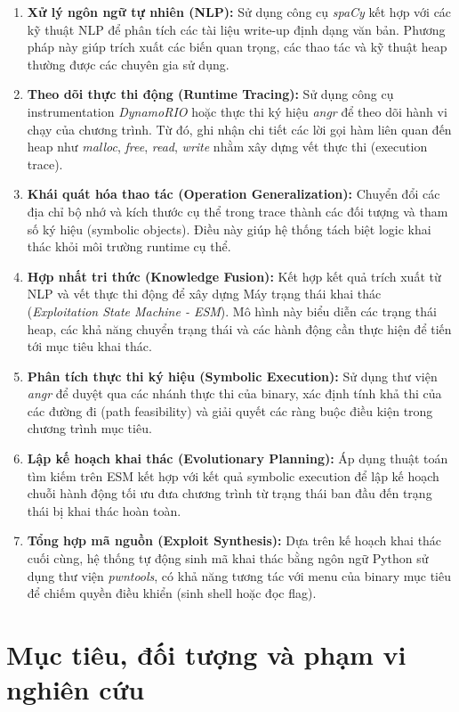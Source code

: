 \documentclass[final]{hcmuitthesis}
\begin{document}
\begin{enumerate}
    \item \textbf{Xử lý ngôn ngữ tự nhiên (NLP):} Sử dụng công cụ \textit{spaCy} kết hợp với các kỹ thuật NLP để phân tích các tài liệu write-up định dạng văn bản. Phương pháp này giúp trích xuất các biến quan trọng, các thao tác và kỹ thuật heap thường được các chuyên gia sử dụng.
    \item \textbf{Theo dõi thực thi động (Runtime Tracing):} Sử dụng công cụ instrumentation \textit{DynamoRIO} hoặc thực thi ký hiệu \textit{angr} để theo dõi hành vi chạy của chương trình. Từ đó, ghi nhận chi tiết các lời gọi hàm liên quan đến heap như \textit{malloc}, \textit{free}, \textit{read}, \textit{write} nhằm xây dựng vết thực thi (execution trace).
    \item \textbf{Khái quát hóa thao tác (Operation Generalization):} Chuyển đổi các địa chỉ bộ nhớ và kích thước cụ thể trong trace thành các đối tượng và tham số ký hiệu (symbolic objects). Điều này giúp hệ thống tách biệt logic khai thác khỏi môi trường runtime cụ thể.
    \item \textbf{Hợp nhất tri thức (Knowledge Fusion):} Kết hợp kết quả trích xuất từ NLP và vết thực thi động để xây dựng Máy trạng thái khai thác (\textit{Exploitation State Machine - ESM}). Mô hình này biểu diễn các trạng thái heap, các khả năng chuyển trạng thái và các hành động cần thực hiện để tiến tới mục tiêu khai thác.
    \item \textbf{Phân tích thực thi ký hiệu (Symbolic Execution):} Sử dụng thư viện \textit{angr} để duyệt qua các nhánh thực thi của binary, xác định tính khả thi của các đường đi (path feasibility) và giải quyết các ràng buộc điều kiện trong chương trình mục tiêu.
    \item \textbf{Lập kế hoạch khai thác (Evolutionary Planning):} Áp dụng thuật toán tìm kiếm trên ESM kết hợp với kết quả symbolic execution để lập kế hoạch chuỗi hành động tối ưu đưa chương trình từ trạng thái ban đầu đến trạng thái bị khai thác hoàn toàn.
    \item \textbf{Tổng hợp mã nguồn (Exploit Synthesis):} Dựa trên kế hoạch khai thác cuối cùng, hệ thống tự động sinh mã khai thác bằng ngôn ngữ Python sử dụng thư viện \textit{pwntools}, có khả năng tương tác với menu của binary mục tiêu để chiếm quyền điều khiển (sinh shell hoặc đọc flag).
\end{enumerate}

\section{Mục tiêu, đối tượng và phạm vi nghiên cứu}
\end{document}
